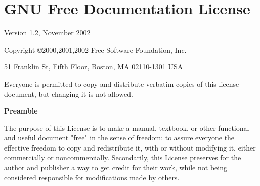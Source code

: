 \appendix







\chapter{GNU Free Documentation License}
\label{label_fdl}

 \begin{center}

       Version 1.2, November 2002


 Copyright \copyright 2000,2001,2002  Free Software Foundation, Inc.
 
 \bigskip
 
     51 Franklin St, Fifth Floor, Boston, MA  02110-1301  USA
  
 \bigskip
 
 Everyone is permitted to copy and distribute verbatim copies
 of this license document, but changing it is not allowed.
\end{center}


\begin{center}
{\bf\large Preamble}
\end{center}

The purpose of this License is to make a manual, textbook, or other
functional and useful document "free" in the sense of freedom: to
assure everyone the effective freedom to copy and redistribute it,
with or without modifying it, either commercially or noncommercially.
Secondarily, this License preserves for the author and publisher a way
to get credit for their work, while not being considered responsible
for modifications made by others.

